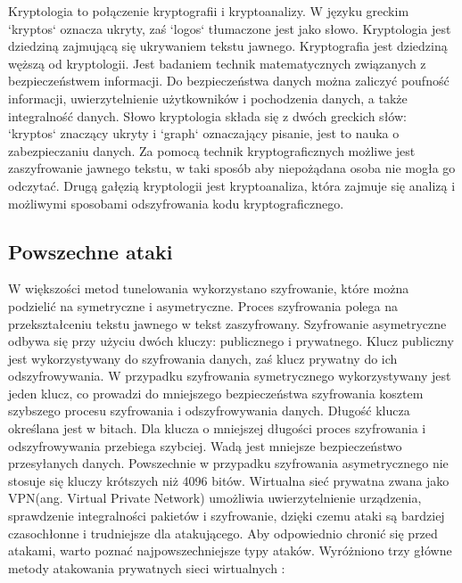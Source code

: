 \documentclass[12p]{article}
\begin{document}
\quad Kryptologia to połączenie kryptografii i kryptoanalizy. W języku greckim `kryptos` oznacza ukryty, zaś `logos` tłumaczone jest jako słowo. Kryptologia jest dziedziną zajmującą się ukrywaniem tekstu jawnego. Kryptografia jest dziedziną węższą od kryptologii. Jest badaniem technik matematycznych związanych z bezpieczeństwem informacji. Do bezpieczeństwa danych można zaliczyć poufność informacji, uwierzytelnienie użytkowników i pochodzenia danych, a także integralność danych. Słowo kryptologia składa się z dwóch greckich słów: `kryptos` znaczący ukryty i `graph` oznaczający pisanie, jest to nauka o zabezpieczaniu danych. Za pomocą technik kryptograficznych możliwe jest zaszyfrowanie jawnego tekstu, w taki sposób aby niepożądana osoba nie mogła go odczytać. Drugą gałęzią kryptologii jest kryptoanaliza, która zajmuje się analizą i możliwymi sposobami odszyfrowania kodu kryptograficznego.

\subsection{Powszechne ataki}
\quad W większości metod tunelowania wykorzystano szyfrowanie, które można podzielić na symetryczne i asymetryczne. Proces szyfrowania polega na przekształceniu tekstu jawnego w tekst zaszyfrowany. Szyfrowanie asymetryczne odbywa się przy użyciu dwóch kluczy: publicznego i prywatnego. Klucz publiczny jest wykorzystywany do szyfrowania danych, zaś klucz prywatny do ich odszyfrowywania. W przypadku szyfrowania symetrycznego wykorzystywany jest jeden klucz, co prowadzi do mniejszego bezpieczeństwa szyfrowania kosztem szybszego procesu szyfrowania i odszyfrowywania danych. 
Długość klucza określana jest w bitach. Dla klucza o mniejszej długości proces szyfrowania i odszyfrowywania przebiega szybciej. Wadą jest mniejsze bezpieczeństwo przesyłanych danych. Powszechnie w przypadku szyfrowania asymetrycznego nie stosuje się kluczy krótszych niż 4096 bitów. Wirtualna sieć prywatna zwana jako VPN(ang. Virtual Private Network) umożliwia uwierzytelnienie urządzenia, sprawdzenie integralności pakietów i szyfrowanie, dzięki czemu ataki są bardziej czasochłonne i trudniejsze dla atakującego. Aby odpowiednio chronić się przed atakami, warto poznać najpowszechniejsze typy ataków. Wyróżniono trzy główne metody atakowania prywatnych sieci wirtualnych :
\end{document}
